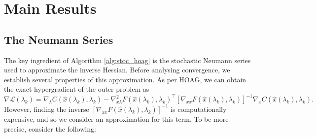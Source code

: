 \documentclass[11pt, twoside]{report}
\begin{document}
\section{Main Results}
\subsection{The Neumann Series} \label{neumann_series}

The key ingredient of Algorithm \ref{alg:stoc_hoag} is the stochastic Neumann series used to approximate the inverse Hessian. Before analysing convergence, we establish several properties of this approximation. As per HOAG, we can obtain the exact hypergradient of the outer problem as
\begin{equation} \label{exact_hyper}
    \nabla\mathcal{L}(\lambda_k) = \nabla_\lambda {C}(\hat{x}(\lambda_k),\lambda_k) - \nabla_{x \lambda}^2 {F}(\hat{x}(\lambda_k),\lambda_k)^\top \left[\nabla_{xx} {F}(\hat{x}(\lambda_k),\lambda_k) \right]^{-1} \nabla_x {C}(\hat{x}(\lambda_k),\lambda_k).
\end{equation}
However, finding the inverse $\left[\nabla_{xx} {F}(\hat{x}(\lambda_k),\lambda_k) \right]^{-1}$ is computationally expensive, and so we consider an approximation for this term. To be more precise, consider the following:
\end{document}
